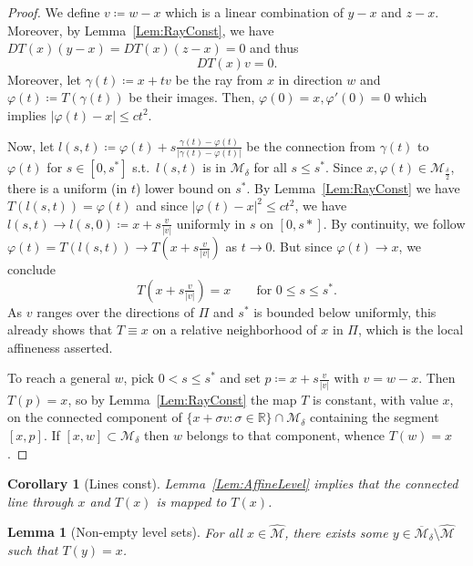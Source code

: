 \documentclass[11pt]{amsart}%
\theoremstyle{plain}
\newtheorem{lemma}[definition]{Lemma}
\newtheorem{corollary}[definition]{Corollary}
\newcommand{\1}{\mathbf{1}}
\newcommand{\M}{\mathcal{M}}
\begin{document}
\begin{proof}
We define $v\coloneqq w-x$ which is a linear combination of $y-x$ and $z-x$. Moreover, by Lemma~\ref{Lem:RayConst}, we have $DT(x)(y-x)=DT(x)(z-x)=0$ and thus
$$DT(x)v=0.$$
Moreover, let $\gamma(t)\coloneqq x+tv$ be the ray from $x$ in direction $w$ and $\varphi(t)\coloneqq T(\gamma(t))$ be their images. Then, $\varphi(0)=x, \varphi'(0)=0$ which implies $|\varphi(t)-x|\leq ct^2$.

Now, let $l(s,t)\coloneqq \varphi(t)+s\frac{\gamma(t)-\varphi(t)}{|\gamma(t)-\varphi(t)|}$ be the connection from $\gamma(t)$ to $\varphi(t)$ for $s\in [0,s^*]$ s.t.\ $l(s,t)$ is in $\M_\delta$ for all $s\leq s^*$. Since $x,\varphi(t)\in \M_{\frac{\delta}{2}}$, there is a uniform (in $t$) lower bound on $s^*$. By Lemma~\ref{Lem:RayConst} we have $T(l(s,t))=\varphi(t)$ and since $|\varphi(t)-x|^2\leq ct^2$, we have $l(s,t)\to l(s,0)\coloneqq x+s\frac{v}{|v|}$ uniformly in $s$ on $[0,s*]$. By continuity, we follow $\varphi(t)=T(l(s,t))\to T\left(x+s\frac{v}{|v|}\right)$ as $t\to 0$. But since $\varphi(t)\to x$, we conclude
$$T\!\left(x+s\tfrac{v}{|v|}\right)=x \qquad \text{for } 0\le s\le s^* .$$
As $v$ ranges over the directions of $\Pi$ and $s^*$ is bounded below uniformly, this already shows
that $T\equiv x$ on a relative neighborhood of $x$ in $\Pi$, which is the local affineness asserted.

To reach a general $w$, pick $0<s\le s^*$ and set $p\coloneqq x+s\frac{v}{|v|}$ with $v=w-x$. Then
$T(p)=x$, so by Lemma~\ref{Lem:RayConst} the map $T$ is constant, with value $x$, on the connected
component of $\{x+\sigma v:\sigma\in\mathbb{R}\}\cap \M_\delta$ containing the segment $[x,p]$. If
$[x,w]\subset \M_\delta$ then $w$ belongs to that component, whence $T(w)=x$.
\end{proof}

\begin{corollary}[Lines const]
    Lemma~\ref{Lem:AffineLevel} implies that the connected line through $x$ and $T(x)$ is mapped to $T(x)$.
    \label{Cor:LinesConst}
\end{corollary}

\begin{lemma}[Non-empty level sets]
For all $x\in \widehat{\M}$, there exists some $y\in \overline{\M}_\delta \setminus \widehat{\M}$ such that $T(y)=x$.
\label{Lem:LevelSetNonEmpty}
\end{lemma}
\end{document}
